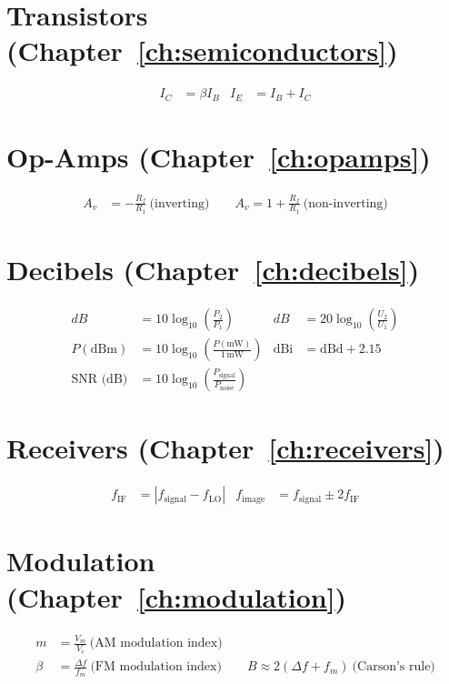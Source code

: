 \section*{Transistors (Chapter~\ref{ch:semiconductors})}
\begin{align*}
I_C &= \beta I_B & I_E &= I_B+I_C
\end{align*}

\section*{Op-Amps (Chapter~\ref{ch:opamps})}
\begin{align*}
A_v &= -\frac{R_f}{R_1}\ \text{(inverting)} \qquad A_v = 1+\frac{R_f}{R_1}\ \text{(non-inverting)}
\end{align*}

\section*{Decibels (Chapter~\ref{ch:decibels})}
\begin{align*}
dB &= 10\log_{10}\!\left(\frac{P_2}{P_1}\right) & dB &= 20\log_{10}\!\left(\frac{U_2}{U_1}\right) \\
P(\text{dBm}) &= 10\log_{10}\!\left(\frac{P(\text{mW})}{1\,\text{mW}}\right) & \text{dBi} &= \text{dBd}+2.15 \\
\text{SNR (dB)} &= 10\log_{10}\!\left(\frac{P_{\text{signal}}}{P_{\text{noise}}}\right)
\end{align*}

\section*{Receivers (Chapter~\ref{ch:receivers})}
\begin{align*}
f_{\text{IF}} &= |f_{\text{signal}}-f_{\text{LO}}| & f_{\text{image}} &= f_{\text{signal}}\pm2f_{\text{IF}}
\end{align*}

\section*{Modulation (Chapter~\ref{ch:modulation})}
\begin{align*}
m &= \frac{V_m}{V_c}\ \text{(AM modulation index)} \\
\beta &= \frac{\Delta f}{f_m}\ \text{(FM modulation index)} \qquad B \approx 2(\Delta f+f_m)\ \text{(Carson's rule)}
\end{align*}

